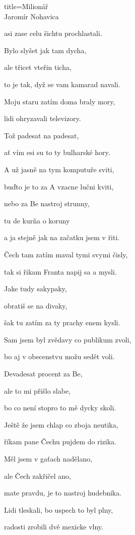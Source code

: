 \begin{song}{title=\predtitle\centering Milionář \\\large Jaromír Nohavica  \vspace*{-0.3cm}}
\begin{centerjustified}
\begin{varwidth}[t]{0.48\textwidth}
asi zase celu šichtu prochlastali.

Bylo slyšet jak tam dycha,

ale třicet vteřin ticha,

to je tak, dyž se vam kamarad navali.

\sloka
Moju staru zatím doma braly mory,

lidi ohryzavali televizory.



\end{varwidth}\mezisloupci\begin{varwidth}[t]{0.5\textwidth}\setlength{\parindent}{\pindent}
\vspace*{0.60cm}  %

Tož padesat na padesat,

ať vím esi su to ty bulharské hory.

\sloka
A už jasně na tym komputuře sviti,

buďto je to za A vzacne lučni kviti,

nebo za Be nastroj strunny,

tu de kurňa o koruny

a ja stejně jak na začatku jsem v řiti.

\sloka
Čech tam zatím maval tymi svymi čisly,

tak si řikam Franta napij sa a mysli.

Jake tudy sakypaky,

obratiš se na divaky,

šak tu zatím za ty prachy enem kysli.

\sloka
Sam jsem byl zvědavy co publikum zvoli,

bo aj v obecenstvu možu sedět voli.

Devadesat procent za Be,

ale to mi přišlo slabe,

bo co není stopro to mě dycky skoli.

\sloka
Ještě že jsem chlap co zboja neutika,

říkam pane Čechu pujdem do rizika.

Měl jsem v gaťach nadělano,

ale Čech zakřičel ano,

mate pravdu, je to nastroj hudebnika.

\sloka
Lidi tleskali, bo uspech to byl plny,

radosti zrobili dvě mexicke vlny.


\end{varwidth}
\end{centerjustified}
\end{song}
